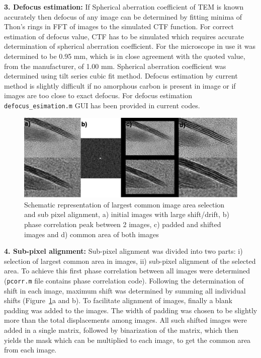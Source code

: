 \textbf{3. Defocus estimation:}
If Spherical aberration coefficient of TEM is known accurately then defocus of any image can be determined by fitting minima of Thon's rings in FFT of images to the simulated CTF function.
For correct estimation of defocus value, CTF has to be simulated which requires accurate determination of spherical aberration coefficient.
For the microscope in use it was determined to be 0.95 mm, which is in close agreement with the quoted value, from the manufacturer, of 1.00 mm.
Spherical aberration coefficient was determined using tilt series cubic fit method.\cite{Koster1991} 
Defocus estimation by current method is slightly difficult if no amorphous carbon is present in image or if images are too close to exact defocus.
For defocus estimation \texttt{defocus\_esimation.m} GUI has been provided in current codes.

\begin{figure}
    \centering
    \includegraphics[width=\textwidth]{figures/LargestArea.pdf}
    \caption{Schematic representation of largest common image area selection and sub pixel alignment, a) initial images with large shift/drift, b) phase correlation peak between 2 images, c) padded and shifted images and d) common area of both images}
    \label{fig:subpixel}
\end{figure}

\textbf{4. Sub-pixel alignment:}
Sub-pixel alignment was divided into two parts: i) selection of largest common area in images, ii) sub-pixel alignment of the selected area.
To achieve this first phase correlation between all images were determined (\texttt{pcorr.m} file contains phase correlation code).
Following the determination of shift in each image, maximum shift was determined by summing all individual shifts (Figure~\ref{fig:subpixel}a and b).
To facilitate alignment of images, finally a blank padding was added to the images.
The width of padding was chosen to be slightly more than the total displacements among images.
All such shifted images were added in a single matrix, followed by binarization of the matrix, which then yields the mask which can be multiplied to each image, to get the common area from each image.

